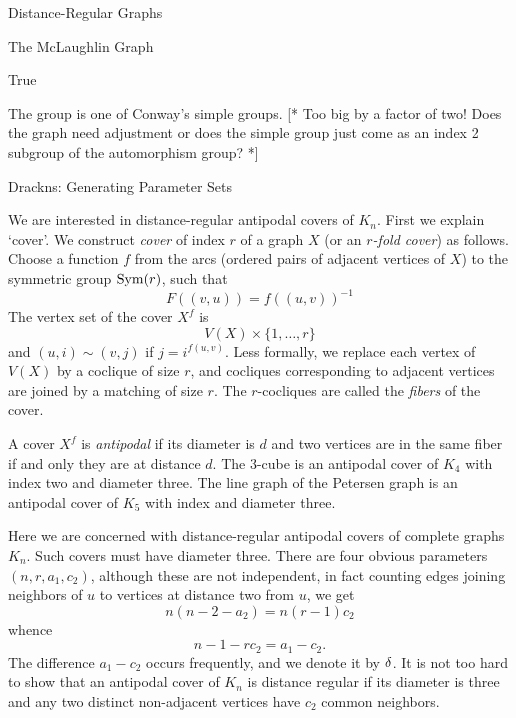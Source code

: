 \begin{chap}{Distance-Regular Graphs}
\begin{sect}{The McLaughlin Graph}
\begin{sagecode}
\begin{sageoutput}
True
\end{sageoutput}
\end{sagecode}
%
\begin{para}
The group is one of Conway's simple groups.  [* Too big by a factor of two!  Does the graph need adjustment or does the simple group just come as an index 2 subgroup of the automorphism group? *]
\end{para}
%
\end{sect}
%
\begin{sect}{Drackns: Generating Parameter Sets}
%
\begin{para}
We are interested in distance-regular antipodal covers of $K_n$.
First we explain `cover'. We construct \textsl{cover} of
index $r$ of a graph $X$ (or an \textsl{$r$-fold cover})
as follows. Choose a function $f$ from the arcs (ordered pairs of adjacent
vertices of $X$) to the symmetric group $\operatorname{Sym}(r)$, such that
\[
    F((v,u)) =f((u,v))^{-1}
\]
The vertex set of the cover $X^f$ is 
\[
    V(X)\times \{1,\ldots,r\}
\]
and $(u,i)\sim (v,j)$ if $j = i^{f(u,v)}$. Less formally, we replace each
vertex of $V(X)$ by a coclique of size $r$, and cocliques corresponding
to adjacent vertices are joined by a matching of size $r$. The $r$-cocliques
are called the \textsl{fibers} of the cover.
\end{para}
%
\begin{para}
A cover $X^f$ is \textsl{antipodal} if its diameter is $d$ and two vertices
are in the same fiber if and only they are at distance $d$. The 3-cube is an antipodal
cover of $K_4$ with index two and diameter three. The line graph of the Petersen
graph is an antipodal cover of $K_5$ with index and diameter three.
\end{para}
%
\begin{para}
Here we are concerned with distance-regular antipodal covers of complete graphs $K_n$.
Such covers must have diameter three. There are four obvious parameters $(n,r,a_1,c_2)$,
although these are not independent, in fact counting edges joining neighbors
of $u$ to vertices at distance two from $u$, we get
\[
    n(n-2-a_2) = n(r-1)c_2
\]
whence
\begin{equation}
\label{eq:n1rc2}
    n-1-rc_2 = a_1-c_2.
\end{equation}
The difference $a_1-c_2$ occurs frequently, and we denote it by $\delta$.
It is not too hard to show that an antipodal
cover of $K_n$ is distance regular if its diameter is three and any two 
distinct non-adjacent vertices have $c_2$ common neighbors.

\end{para}
\end{sect}
\end{chap}
